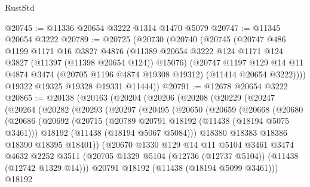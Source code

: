 \begin{lexlean}{RustStd}
\begin{coremodule}
@20745 := @11336 @20654 @3222 @1314 @1470 @5079
@20747 := @11345 @20654 @3222
@20789 := @20725
    (@20730
      (@20740
        (@20745
          (@20747
            @486
            @1199
            @1171
            @16
            @3827
            @4876
            (@11389 @20654 @3222 @124 @1171 @124 @3827 (@11397 (@11398 @20654 @124)) @15076)
            (@20747
              @1197
              @129
              @14
              @11
              @4874
              @3474
              (@20705 @1196 @4874 @19308 @19312)
              (@11414 @20654 @3222))))
        @19322
        @19325
        @19328
        @19331
        @11444))
@20791 := @12678 @20654 @3222
@20865 := @20138
    (@20163
      (@20204
        (@20206
          (@20208
            (@20229
              (@20247
                (@20264
                  (@20282
                    (@20293
                      (@20297
                        (@20495
                          (@20650
                            (@20659
                              (@20668
                                (@20680
                                  (@20686
                                    (@20692
                                      (@20715
                                        (@20789 @20791 @18192 (@11438 (@18194 @5075 @3461)))
                                        @18192
                                        (@11438 (@18194 @5067 @5084)))
                                      @18380
                                      @18383
                                      @18386
                                      @18390
                                      @18395
                                      @18401))
                                  (@20670
                                    @1330
                                    @129
                                    @14
                                    @11
                                    @5104
                                    @3461
                                    @3474
                                    @4632
                                    @2252
                                    @3511
                                    (@20705
                                      @1329
                                      @5104
                                      (@12736 (@12737 @5104))
                                      (@11438 (@12742 @1329 @14)))
                                    @20791
                                    @18192
                                    (@11438 (@18194 @5099 @3461)))
                                  @18192

\end{coremodule}
\end{lexlean}
